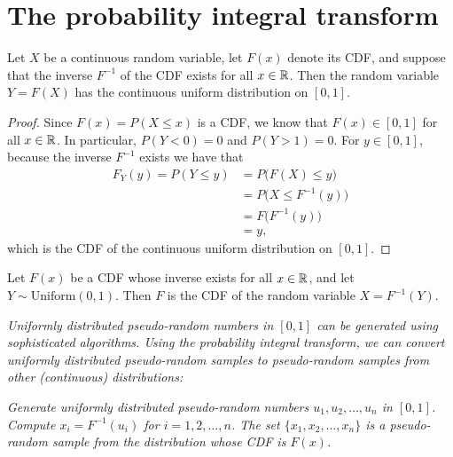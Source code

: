 \section{The probability integral transform}
\begin{theorem}
Let $X$ be a continuous random variable, let $F(x)$ denote its CDF, and suppose that the inverse $F^{-1}$ of the CDF exists for all $x\in\mathbb{R}$. Then the random variable $Y=F(X)$ has the continuous uniform distribution on $[0,1]$.
\end{theorem}

\begin{proof}
Since $F(x)=P(X\leq x)$ is a CDF, we know that $F(x)\in [0,1]$ for all $x\in\mathbb{R}$. In particular, $P(Y<0)=0$ and $P(Y>1)=0$. For $y\in[0,1]$, because the inverse $F^{-1}$ exists we have that
\begin{align*}
F_Y(y) = P(Y\leq y) 
	& = P\big(F(X)\leq y\big) \\
	& = P\big(X\leq F^{-1}(y)\big) \\
	& = F\big(F^{-1}(y)\big) \\
	& = y,
\end{align*}
which is the CDF of the continuous uniform distribution on $[0,1]$.
\end{proof}

\begin{corollary}
Let $F(x)$ be a CDF whose inverse exists for all $x\in\mathbb{R}$, and let $Y\sim\text{Uniform}(0,1)$. Then $F$ is the CDF of the random variable $X = F^{-1}(Y)$.
\end{corollary}

\bit
\it Uniformly distributed pseudo-random numbers in $[0,1]$ can be generated using sophisticated algorithms.
\it Using the probability integral transform, we can convert uniformly distributed pseudo-random samples to pseudo-random samples from other (continuous) distributions:
\eit

\ben
\it Generate uniformly distributed pseudo-random numbers $u_1,u_2,\ldots,u_n$ in $[0,1]$.
\it Compute $x_i = F^{-1}(u_i)$ for $i=1,2,\ldots,n$.
\een
The set $\{x_1,x_2,\ldots,x_n\}$ is a pseudo-random sample from the distribution whose CDF is $F(x)$.

